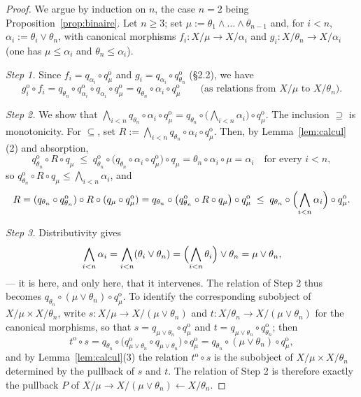 \documentclass[11pt,a4paper]{article}
\theoremstyle{plain}
\theoremstyle{definition}
\theoremstyle{remark}
\theoremstyle{plain}
\newcommand{\op}{\mathrm{o}}
\begin{document}
\begin{proof}
We argue by induction on $n$, the case $n = 2$ being
Proposition~\ref{prop:binaire}. Let $n \ge 3$; set
$\mu := \theta_1 \wedge \dots \wedge \theta_{n-1}$ and, for $i < n$,
$\alpha_i := \theta_i \vee \theta_n$, with canonical morphisms
$f_i \colon X/\mu \to X/\alpha_i$ and $g_i \colon X/\theta_n \to X/\alpha_i$
(one has $\mu \le \alpha_i$ and $\theta_n \le \alpha_i$).

\emph{Step 1.} Since $f_i = q_{\alpha_i} \circ q_\mu^{\op}$ and
$g_i = q_{\alpha_i} \circ q_{\theta_n}^{\op}$ (\S 2.2), we have
\[
g_i^{\op} \circ f_i
= q_{\theta_n} \circ q_{\alpha_i}^{\op} \circ q_{\alpha_i}
\circ q_\mu^{\op}
= q_{\theta_n} \circ \alpha_i \circ q_\mu^{\op}
\qquad \text{(as relations from } X/\mu \text{ to } X/\theta_n\text{)}.
\]

\emph{Step 2.} We show that
$\bigwedge_{i<n} q_{\theta_n} \circ \alpha_i \circ q_\mu^{\op}
= q_{\theta_n} \circ \bigl(\bigwedge_{i<n} \alpha_i\bigr)
\circ q_\mu^{\op}$.
The inclusion $\supseteq$ is monotonicity. For $\subseteq$, set
$R := \bigwedge_{i<n} q_{\theta_n} \circ \alpha_i \circ q_\mu^{\op}$. Then, by
Lemma~\ref{lem:calcul}(2) and absorption,
\[
q_{\theta_n}^{\op} \circ R \circ q_\mu
\;\le\;
q_{\theta_n}^{\op} \circ \bigl(q_{\theta_n} \circ \alpha_i
\circ q_\mu^{\op}\bigr) \circ q_\mu
= \theta_n \circ \alpha_i \circ \mu = \alpha_i
\quad \text{for every } i<n,
\]
so $q_{\theta_n}^{\op} \circ R \circ q_\mu \le
\bigwedge_{i <n} \alpha_i$, and
\[
R = (q_{\theta_n} \circ q_{\theta_n}^{\op}) \circ R
\circ (q_\mu \circ q_\mu^{\op})
= q_{\theta_n} \circ \bigl(q_{\theta_n}^{\op} \circ R
\circ q_\mu\bigr) \circ q_\mu^{\op}
\;\le\; q_{\theta_n} \circ \Bigl(\bigwedge_{i<n} \alpha_i\Bigr)
\circ q_\mu^{\op}.
\]

\emph{Step 3.} Distributivity gives
\[
\bigwedge_{i<n} \alpha_i
= \bigwedge_{i<n} (\theta_i \vee \theta_n)
= \Bigl(\bigwedge_{i<n} \theta_i\Bigr) \vee \theta_n
= \mu \vee \theta_n,
\]
--- it is here, and only here, that it intervenes. The relation 
of Step 2
thus becomes $q_{\theta_n} \circ (\mu \vee \theta_n) \circ q_\mu^{\op}$.
To identify the corresponding subobject of $X/\mu \times X/\theta_n$,
write $s \colon X/\mu \to X/(\mu \vee \theta_n)$ and
$t \colon X/\theta_n \to X/(\mu \vee \theta_n)$ for the canonical
morphisms, so that $s = q_{\mu\vee\theta_n} \circ q_\mu^{\op}$ and
$t = q_{\mu\vee\theta_n} \circ q_{\theta_n}^{\op}$; then
\[
t^{\op} \circ s
= q_{\theta_n} \circ \bigl(q_{\mu\vee\theta_n}^{\op} \circ
q_{\mu\vee\theta_n}\bigr) \circ q_\mu^{\op}
= q_{\theta_n} \circ (\mu \vee \theta_n) \circ q_\mu^{\op},
\]
and by Lemma~\ref{lem:calcul}(3) the relation $t^{\op} \circ s$ is the
subobject of $X/\mu \times X/\theta_n$ determined by the pullback of $s$
and $t$. The relation of Step 2 is therefore exactly the
pullback $P$ of $X/\mu \to X/(\mu\vee\theta_n) \leftarrow X/\theta_n$.


\end{proof}
\end{document}
